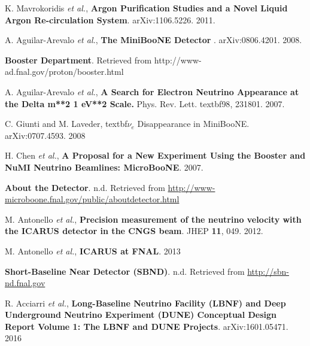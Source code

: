  K. Mavrokoridis \textit{et al.}, \textbf{Argon Purification Studies and a Novel Liquid Argon Re-circulation System}. arXiv:1106.5226. 2011.	

 A. Aguilar-Arevalo \textit{et al.}, \textbf{The MiniBooNE Detector
}. arXiv:0806.4201. 2008.

 \textbf{Booster Department}. Retrieved from http://www-ad.fnal.gov/proton/booster.html

 A. Aguilar-Arevalo \textit{et al.}, \textbf{A Search for Electron Neutrino Appearance at the Delta m**2 1 eV**2 Scale.} Phys. Rev. Lett. textbf{98}, 231801. 2007. 

 C. Giunti and M. Laveder, textbf{$\nu_e$ Disappearance in MiniBooNE}. arXiv:0707.4593. 2008


 H. Chen \textit{et al.}, \textbf{A Proposal for a New Experiment Using the Booster and NuMI Neutrino Beamlines: MicroBooNE}. 2007.




 \textbf{About the Detector}. n.d. Retrieved from \href{http://www-microboone.fnal.gov/public/aboutdetector.html}{http://www-microboone.fnal.gov/public/aboutdetector.html}

 M. Antonello \textit{et al.}, \textbf{Precision measurement of the neutrino velocity with the ICARUS detector in the CNGS beam}. JHEP \textbf{11}, 049. 2012.

 M. Antonello \textit{et al.}, \textbf{ICARUS at FNAL}. 2013

 \textbf{Short-Baseline Near Detector (SBND)}. n.d. Retrieved from \href{http://sbn-nd.fnal.gov}{http://sbn-nd.fnal.gov}


 R. Acciarri \textit{et al.}, \textbf{Long-Baseline Neutrino Facility (LBNF) and Deep Underground Neutrino Experiment (DUNE) Conceptual Design Report Volume 1: The LBNF and DUNE Projects}. 	arXiv:1601.05471. 2016 

